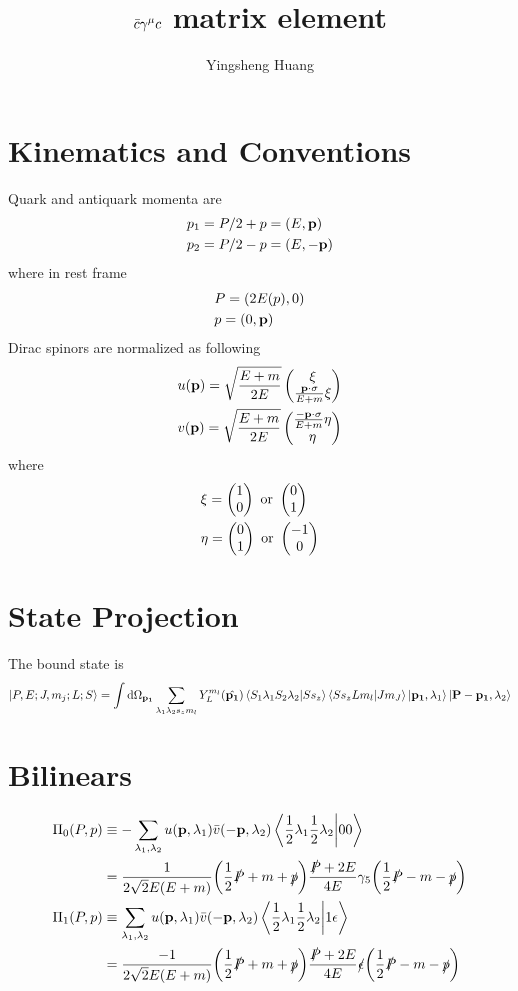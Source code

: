 \documentclass{article}
\title{$\bar c\gamma^{\mu} c$ matrix element}
\author{Yingsheng Huang}
\begin{document}
\maketitle
\section{Kinematics and Conventions}
Quark and antiquark momenta are
\begin{align}
    &p_1=P/2+p=(E,\vb{p})\\
    &p_2=P/2-p=(E,-\vb{p})
\end{align}
where in rest frame
\begin{align}
    &P=(2E(p),0)\\
    &p=(0,\vb{p})
\end{align}
Dirac spinors are normalized as following
\begin{align}
    &u(\vb{p})=\sqrt{\frac{E+m}{2E}}\pmqty{\xi\\\frac{\vb{p}\cdot\sigma}{E+m}\xi}\\
    &v(\vb{p})=\sqrt{\frac{E+m}{2E}}\pmqty{\frac{-\vb{p}\cdot\sigma}{E+m}\eta\\\eta}
\end{align}
where
\begin{align}
    &\xi=\pmqty{1\\0}\text{ or }\pmqty{0\\1}\\
    &\eta=\pmqty{0\\1}\text{ or }\pmqty{-1\\0}
\end{align}
\section{State Projection}
The bound state is\cite{Weinberg2015}
\begin{align}
    \ket{P,E;J,m_j;L;S}=\int\dd\Omega_{\vb{p_1}}\sum_{\lambda_1\lambda_2s_zm_l}Y_L^{m_l}(\hat{\vb{p_1}})\braket{S_1\lambda_{1}S_2\lambda_{2}}{Ss_z}\braket{Ss_zLm_l}{Jm_J}\ket{\vb{p_1},\lambda_{1}}\ket{\vb{P-p_1},\lambda_{2}}
\end{align}
\section{Bilinears\cite{Bodwin:2002hg}}
\begin{align}
    \Pi_0(P,p)&\equiv-\sum_{\lambda_1,\lambda_2}u(\vb{p},\lambda_1)\bar v(-\vb{p},\lambda_2)\braket{\frac{1}{2}\lambda_1\frac{1}{2}\lambda_2}{00}\\
    &=\frac{1}{2\sqrt{2}E(E+m)}\pqty{\frac{1}{2}\slashed P+m+\slashed p}\frac{\slashed P+2E}{4E}\gamma_5\pqty{\frac{1}{2}\slashed P-m-\slashed p}\\
    \Pi_1(P,p)&\equiv\sum_{\lambda_1,\lambda_2}u(\vb{p},\lambda_1)\bar v(-\vb{p},\lambda_2)\braket{\frac{1}{2}\lambda_1\frac{1}{2}\lambda_2}{1\epsilon}\\
    &=\frac{-1}{2\sqrt{2}E(E+m)}\pqty{\frac{1}{2}\slashed P+m+\slashed p}\frac{\slashed P+2E}{4E}\slashed\epsilon\pqty{\frac{1}{2}\slashed P-m-\slashed p}
\end{align}
\end{document}
